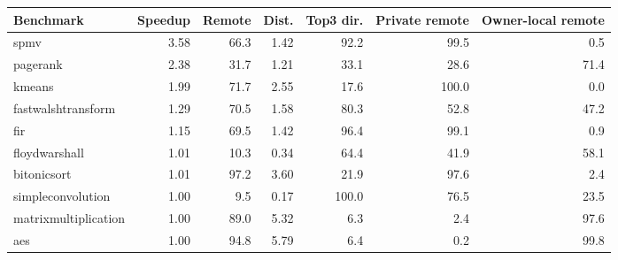 \begin{tabular}{lrrrrrr}
\toprule
Benchmark & Speedup & Remote & Dist. & Top3 dir. & Private remote & Owner-local remote \\
\midrule
spmv & 3.58 & 66.3 & 1.42 & 92.2 & 99.5 & 0.5 \\
pagerank & 2.38 & 31.7 & 1.21 & 33.1 & 28.6 & 71.4 \\
kmeans & 1.99 & 71.7 & 2.55 & 17.6 & 100.0 & 0.0 \\
fastwalshtransform & 1.29 & 70.5 & 1.58 & 80.3 & 52.8 & 47.2 \\
fir & 1.15 & 69.5 & 1.42 & 96.4 & 99.1 & 0.9 \\
floydwarshall & 1.01 & 10.3 & 0.34 & 64.4 & 41.9 & 58.1 \\
bitonicsort & 1.01 & 97.2 & 3.60 & 21.9 & 97.6 & 2.4 \\
simpleconvolution & 1.00 & 9.5 & 0.17 & 100.0 & 76.5 & 23.5 \\
matrixmultiplication & 1.00 & 89.0 & 5.32 & 6.3 & 2.4 & 97.6 \\
aes & 1.00 & 94.8 & 5.79 & 6.4 & 0.2 & 99.8 \\
\bottomrule
\end{tabular}

